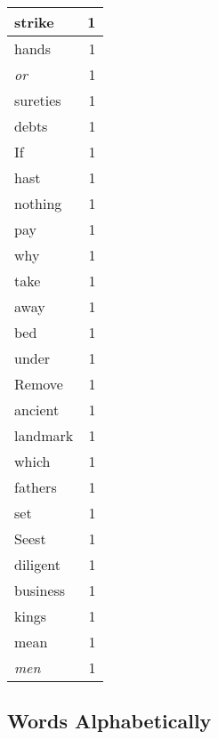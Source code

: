 \begin{center}
\begin{longtable}{l|r}
strike & 1\\ \hline 
hands & 1\\ \hline 
\emph{or} & 1\\ \hline 
sureties & 1\\ \hline 
debts & 1\\ \hline 
If & 1\\ \hline 
hast & 1\\ \hline 
nothing & 1\\ \hline 
pay & 1\\ \hline 
why & 1\\ \hline 
take & 1\\ \hline 
away & 1\\ \hline 
bed & 1\\ \hline 
under & 1\\ \hline 
Remove & 1\\ \hline 
ancient & 1\\ \hline 
landmark & 1\\ \hline 
which & 1\\ \hline 
fathers & 1\\ \hline 
set & 1\\ \hline 
Seest & 1\\ \hline 
diligent & 1\\ \hline 
business & 1\\ \hline 
kings & 1\\ \hline 
mean & 1\\ \hline 
\emph{men} & 1\\ \hline 
\end{longtable}  
\end{center}  


  
\normalsize  

  
  


\subsection{Words Alphabetically}


